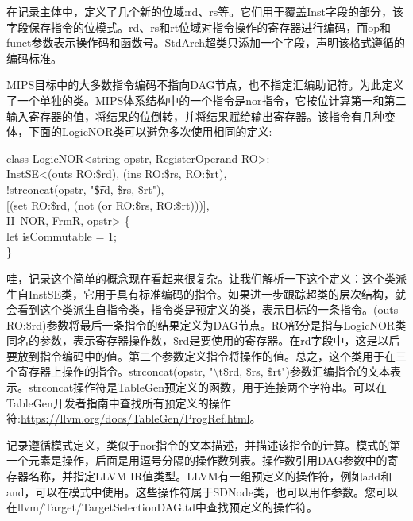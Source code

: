 在记录主体中，定义了几个新的位域:rd、rs等。它们用于覆盖Inst字段的部分，该字段保存指令的位模式。rd、rs和rt位域对指令操作的寄存器进行编码，而op和funct参数表示操作码和函数号。StdArch超类只添加一个字段，声明该格式遵循的编码标准。\par

MIPS目标中的大多数指令编码不指向DAG节点，也不指定汇编助记符。为此定义了一个单独的类。MIPS体系结构中的一个指令是nor指令，它按位计算第一和第二输入寄存器的值，将结果的位倒转，并将结果赋给输出寄存器。该指令有几种变体，下面的LogicNOR类可以避免多次使用相同的定义:\par

\begin{tcolorbox}[colback=white,colframe=black]
class LogicNOR<string opstr, RegisterOperand RO>: \\
\hspace*{0.5cm}InstSE<(outs RO:\$rd), (ins RO:\$rs, RO:\$rt), \\
\hspace*{3cm}!strconcat(opstr, "\t\$rd, \$rs, \$rt"), \\
\hspace*{3cm}[(set RO:\$rd, (not (or RO:\$rs, RO:\$rt)))], \\
\hspace*{3cm}II\underline{~}NOR, FrmR, opstr> \{ \\
\hspace*{0.5cm}let isCommutable = 1; \\
\}
\end{tcolorbox}

哇，记录这个简单的概念现在看起来很复杂。让我们解析一下这个定义：这个类派生自InstSE类，它用于具有标准编码的指令。如果进一步跟踪超类的层次结构，就会看到这个类派生自指令类，指令类是预定义的类，表示目标的一条指令。(outs RO:\$rd)参数将最后一条指令的结果定义为DAG节点。RO部分是指与LogicNOR类同名的参数，表示寄存器操作数，\$rd是要使用的寄存器。在rd字段中，这是以后要放到指令编码中的值。第二个参数定义指令将操作的值。总之，这个类用于在三个寄存器上操作的指令。strconcat(opstr, "$\setminus$t\$rd, \$rs, \$rt")参数汇编指令的文本表示。strconcat操作符是TableGen预定义的函数，用于连接两个字符串。可以在TableGen开发者指南中查找所有预定义的操作符:\url{https://llvm.org/docs/TableGen/ProgRef.html}。\par

记录遵循模式定义，类似于nor指令的文本描述，并描述该指令的计算。模式的第一个元素是操作，后面是用逗号分隔的操作数列表。操作数引用DAG参数中的寄存器名称，并指定LLVM IR值类型。LLVM有一组预定义的操作符，例如add和and，可以在模式中使用。这些操作符属于SDNode类，也可以用作参数。您可以在llvm/Target/TargetSelectionDAG.td中查找预定义的操作符。\par

